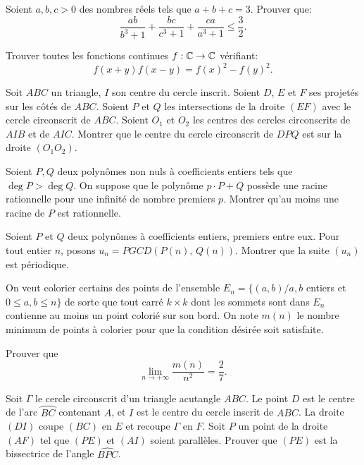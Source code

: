 \begin{exo}{}
Soient $a,b,c>0$ des nombres réels tels que $a+b+c=3$. Prouver que:
$$ \frac{ab}{b^{3}+1}+\frac{bc}{c^{3}+1}+\frac{ca}{a^{3}+1}\le\frac{3}{2}.$$
\end{exo}


\begin{exo}{}
Trouver toutes les fonctions continues $f: \mathbb C \rightarrow \mathbb C$ v\'erifiant:
$$f(x+y) f(x-y) = f(x)^2-f(y)^2.$$
\end{exo}

\begin{exo}{}
Soit $ABC$ un triangle, $I$ son centre du cercle inscrit. Soient $D$, $E$ et $F$ ses projetés sur les côtés de $ABC$. Soient $P$ et $Q$ les intersections de la droite $(EF)$ avec le cercle circonscrit de $ABC$. Soient $O_1$ et $O_2$ les centres des cercles circonscrits de $AIB$ et de $AIC$. Montrer que le centre du cercle circonscrit de $DPQ$ est sur la droite $(O_1O_2)$.
\end{exo}

\begin{exo}{}
Soient $P,Q$ deux polynômes non nuls à coefficients entiers tels que $ \deg P>\deg Q$. On suppose que le polynôme $p \cdot P+Q$ possède une racine rationnelle pour une infinité de nombre premiers $p$. Montrer qu'au moins une racine de $P$ est rationnelle.
\end{exo}

\begin{exo}{}Soient $P$ et $Q$ deux polyn\^omes \`a coefficients entiers, premiers entre eux. Pour tout entier $n$, posons $u_n = PGCD(P(n), \, Q(n))$. Montrer que la suite $(u_n)$ est p\'eriodique.
\end{exo}




\begin{exo}{}
On veut colorier certains des points de l'ensemble $E_{n}=\{(a,b)/a,b$
entiers et $0\leq a,b\leq n\}$ de sorte que tout carr\'{e} $k\times k$ dont
les sommets sont dans $E_{n}$ contienne au moins un point colori\'{e} sur
son bord. On note $m(n)$ le nombre minimum de points \`{a} colorier pour que
la condition d\'{e}sir\'{e}e soit satisfaite.

Prouver que $${\lim_ {{n\rightarrow +\infty }} }\frac{m(n)}{n^{2}}=%
\frac{2}{7}.$$
\end{exo}

\begin{exo}{}Soit $ \Gamma$ le cercle circonscrit d'un triangle acutangle $ABC$. Le point $D$ est le centre de l'arc $ \wideparen {BC}$  contenant  $A$, et $I$ est le centre du cercle inscrit de $ABC$. La droite $(DI)$ coupe $(BC)$ en $E$ et recoupe $ \Gamma$ en $F$. Soit $P$ un point de la droite $(AF)$ tel que $(PE)$ et $(AI)$ soient parallèles. Prouver que $(PE)$ est la bissectrice de l'angle $ \widehat {BPC}$.
\end{exo}


